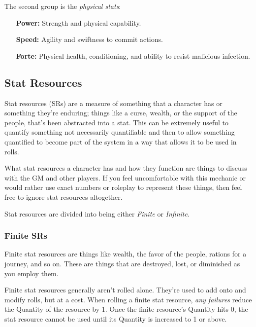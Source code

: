 \documentclass[../main.tex]{subfiles}
\begin{document}
        The second group is the {\em physical stats}:

    \begin{itemize}
        \item [\textbf{Power:}] Strength and physical capability.
        \item [\textbf{Speed:}] Agility and swiftness to commit actions.
        \item [\textbf{Forte:}] Physical health, conditioning, and ability to resist malicious infection.
    \end{itemize}

    \subsection{Stat Resources}

        Stat resources (SRs) are a measure of something that a character has or something they're enduring; things like a curse, wealth, or the support of the people, that's been abstracted into a stat. This can be extremely useful to quantify something not necessarily quantifiable and then to allow something quantified to become part of the system in a way that allows it to be used in rolls.
        
        What stat resources a character has and how they function are things to discuss with the GM and other players. If you feel uncomfortable with this mechanic or would rather use exact numbers or roleplay to represent these things, then feel free to ignore stat resources altogether.

        Stat resources are divided into being either \emph{Finite} or \emph{Infinite}.

        \subsubsection{Finite SRs}
        
        Finite stat resources are things like wealth, the favor of the people, rations for a journey, and so on. These are things that are destroyed, lost, or diminished as you employ them. 

        Finite stat resources generally aren't rolled alone. They're used to add onto and modify rolls, but at a cost. When rolling a finite stat resource, \emph{any failures} reduce the Quantity of the resource by 1. Once the finite resource's Quantity hits 0, the stat resource cannot be used until its Quantity is increased to 1 or above.
\end{document}
